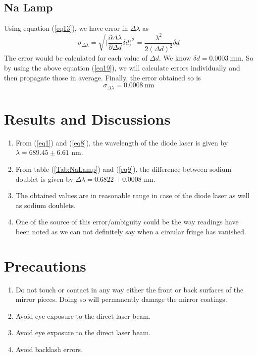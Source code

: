 \documentclass{article}
\begin{document}
    \subsection{Na Lamp}
    Using equation (\ref{eq13}), we have error in $\Delta \lambda$ as
    \begin{equation}
    \label{eq19}
        \sigma_{\Delta \lambda} = \sqrt{\Bigg( \dfrac{\partial \Delta \lambda}{\partial \Delta d} \delta d \Bigg)^2} = \dfrac{\lambda^2}{2 (\Delta d)^2} \delta d
    \end{equation}
    The error would be calculated for each value of $\Delta d$. We know $\delta d = \SI{0.0003}{\milli \metre}$. So by using the above equation (\ref{eq19}), we will calculate errors individually and then propagate those in average. Finally, the error obtained so is
    \begin{equation}
    \label{eq9}
        \boxed{\sigma_{\Delta \lambda} = \SI{0.0008}{\nano \metre}}
    \end{equation}
\section{Results and Discussions}
\begin{enumerate}
    \item From (\ref{eq1}) and (\ref{eq8}), the wavelength of the diode laser is given by $\lambda = 689.45 \pm 6.61$ nm.
    \item From table (\ref{Tab:NaLamp}) and (\ref{eq9}), the difference between sodium doublet is given by $\Delta \lambda = 0.6822 \pm 0.0008$ nm.
    \item The obtained values are in reasonable range in case of the diode laser as well as sodium doublets.
    \item One of the source of this error/ambiguity could be the way readings have been noted as we can not definitely say when a circular fringe has vanished.
\end{enumerate}

\section{Precautions}
\begin{enumerate}
    \item Do not touch or contact in any way either the front or back surfaces of the mirror pieces. Doing so will permanently damage the mirror coatings.
    \item Avoid eye exposure to the direct laser beam.
    \item Avoid eye exposure to the direct laser beam.
    \item Avoid backlash errors.
\end{enumerate}
\end{document}
